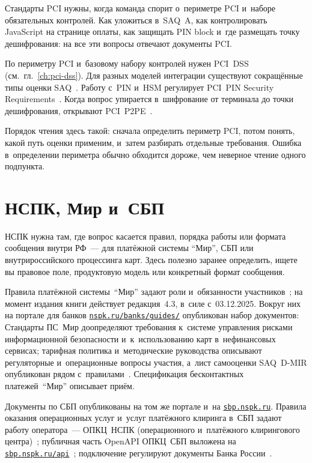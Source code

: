 Стандарты PCI нужны, когда команда спорит о~периметре PCI и~наборе обязательных
контролей. Как уложиться в~SAQ~A, как контролировать JavaScript на странице
оплаты, как защищать PIN block и~где размещать точку дешифрования: на все эти
вопросы отвечают документы PCI.

По периметру PCI и~базовому набору контролей нужен PCI~DSS~\cite{pci-dss-4}
(см.~гл.~\ref{ch:pci-dss}). Для разных моделей интеграции существуют
сокращённые типы оценки SAQ~\cite{pci-saq}. Работу с~PIN и~HSM регулирует
PCI~PIN Security Requirements~\cite{pci-pin-security}. Когда вопрос упирается
в~шифрование от терминала до точки дешифрования, открывают
PCI~P2PE~\cite{pci-p2pe}.

Порядок чтения здесь такой: сначала определить периметр PCI, потом
понять, какой путь оценки применим, и~затем разбирать отдельные требования.
Ошибка в~определении периметра обычно обходится дороже, чем неверное чтение
одного подпункта.

\section*{НСПК, Мир и~СБП}\label{sec:ps-nspk}

НСПК нужна там, где вопрос касается правил, порядка работы или формата
сообщения внутри РФ~--- для платёжной системы \enquote{Мир}, СБП или
внутрироссийского процессинга карт. Здесь полезно заранее определить, ищете вы
правовое поле, продуктовую модель или конкретный формат сообщения.

Правила платёжной системы~\enquote{Мир} задают роли и~обязанности
участников~\cite{nspk-mir-rules,nspk-mir-rules-v43}; на момент издания книги
действует редакция~4.3, в~силе с~03.12.2025. Вокруг них на портале для банков
\href{https://nspk.ru/banks/guides/}{\texttt{nspk.ru/banks/guides/}}
опубликован набор документов: Стандарты ПС~Мир доопределяют требования к~системе
управления рисками информационной безопасности и~к~использованию карт
в~нефинансовых сервисах; тарифная политика и~методические руководства
описывают регуляторные и~операционные вопросы участия, а~лист самооценки
SAQ~D-MIR опубликован рядом с~правилами~\cite{nspk-mir-rules}. Спецификация
бесконтактных платежей~\enquote{Мир} описывает приём.

Документы по СБП опубликованы на том же портале и~на
\href{https://sbp.nspk.ru/}{\texttt{sbp.nspk.ru}}. Правила оказания
операционных услуг и~услуг платёжного клиринга в~СБП задают работу
оператора~--- ОПКЦ~НСПК (операционного и~платёжного клирингового
центра)~\cite{sbp-main}; публичная часть OpenAPI ОПКЦ~СБП
выложена на
\href{https://sbp.nspk.ru/api}{\texttt{sbp.nspk.ru/api}}~\cite{nspk-sbp-openapi};
подключение регулируют документы Банка
России~\cite{cbr-sbp-actions}.

